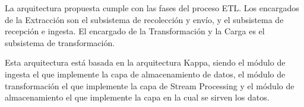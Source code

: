 La arquitectura propuesta cumple con las fases del proceso ETL. Los encargados de la Extracción son el subsistema de recolección y envío, y el subsistema de recepción e ingesta. El encargado de la Transformación y la Carga es el subsistema de transformación.

Esta arquitectura está basada en la arquitectura Kappa\cite{Tfg:kappa}, siendo el módulo de ingesta el que implemente la capa de almacenamiento de datos, el módulo de transformación el que implemente la capa de Stream Processing y el módulo de almacenamiento el que implemente la capa en la cual se sirven los datos.

